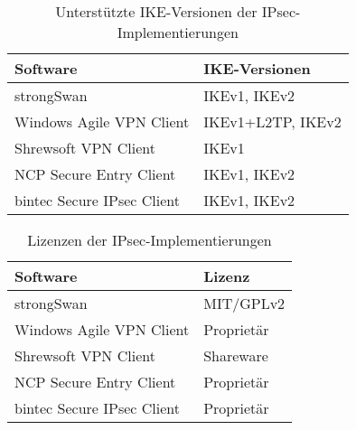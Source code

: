\begin{center}
\begin{table}[h!]
\begin{tabularx}{\textwidth}{|X|X|}\firsthline
Software & IKE-Versionen \\ \hline
strongSwan & IKEv1, IKEv2\\ \hline
Windows Agile VPN Client & IKEv1+L2TP, IKEv2 \\ \hline
Shrewsoft VPN Client & IKEv1 \\ \hline
NCP Secure Entry Client & IKEv1, IKEv2 \\ \hline
bintec Secure IPsec Client & IKEv1, IKEv2 \\ \hline
\end{tabularx}
\label{tab:IPsec-Implementierungen-IKE-Versionen}
\caption{Unterstützte IKE-Versionen der IPsec-Implementierungen}
\end{table}


\begin{table}[h!]
\begin{tabularx}{\textwidth}{|X|X|}\firsthline
Software & Lizenz \\ \hline
strongSwan & MIT/GPLv2 \\ \hline
Windows Agile VPN Client & Proprietär \\ \hline
Shrewsoft VPN Client & Shareware \\ \hline
NCP Secure Entry Client & Proprietär \\ \hline
bintec Secure IPsec Client & Proprietär \\ \hline
\end{tabularx}
\label{tab:IPsec-Implementierungen-Lizenzen}
\caption{Lizenzen der IPsec-Implementierungen}
\end{table}


\end{center}
